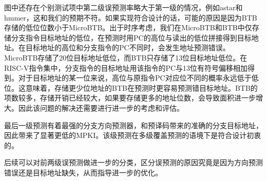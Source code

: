 图中还存在个别测试项中第二级误预测率略大于第一级的情况，例如astar和hmmer，这和我们的预期不符。如果实现符合设计的话，可能的原因是因为BTB存储的低位位数小于MicroBTB。出于时序考虑，我们在MicroBTB和BTB中仅存储分支指令目标地址的低位，在预测时用PC的高位与读出的低位拼接得到目标地址。在目标地址的高位和分支指令的PC不同时，会发生地址预测错误。MicroBTB存储了20位目标地址低位，而BTB只存储了13位目标地址低位。在RISC-V指令集中，分支指令的目标地址用该指令的PC与13位有符号偏移相加得到。对于目标地址的某一位来说，高位与原指令PC对应位不同的概率永远低于低位。这意味着，存储更少位地址的BTB在预测时更容易预测错目标地址。BTB的项数较多，存储开销已经较大，如果要存储更多的地址位数，会导致面积进一步增大。因此该问题的解决还需要进行进一步的考虑和评估。

最后一级预测有着最强的分支方向预测器，和预译码带来的准确的分支目标地址，因此带来了显著更低的MPKI。该级预测在多级覆盖预测的语境下是符合设计初衷的。

后续可以对前两级误预测做进一步的分类，区分误预测的原因究竟是因为方向预测错误还是目标地址缺失，从而指导进一步的优化。